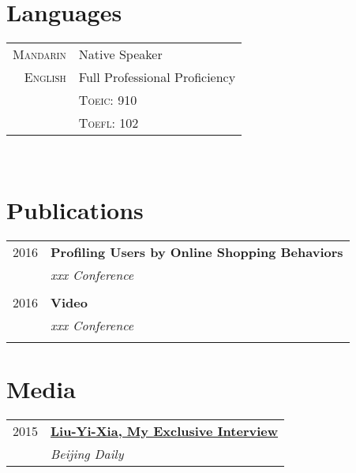 \documentclass[10pt]{article} %
\begin{document}
{\begin{minipage}[t]{0.44\textwidth}
\section{Languages} 

\begin{tabular}{rl}
\textsc{Mandarin}
& Native Speaker \\
\textsc{English}
& Full Professional Proficiency \\
& \textsc{Toeic}: 910 \\
& \textsc{Toefl}: 102 \\
\end{tabular}\\[10pt]


\section{Publications} 

\begin{tabular}{rl}

2016	 & \textbf{Profiling Users by Online Shopping Behaviors}\\
& \textit{xxx Conference}\\ \\

2016	 & \textbf{Video}\\
& \textit{xxx Conference}\\
& \\
\end{tabular}


\section{Media} 

\begin{tabular}{rl}

2015	 & \textbf{\href{http://bjrb.bjd.com.cn/html/2015-12/07/content_335081.htm}{Liu-Yi-Xia, My Exclusive Interview}}\\
& \textit{Beijing Daily}\\


\end{tabular}
\end{minipage}}
\end{document}
